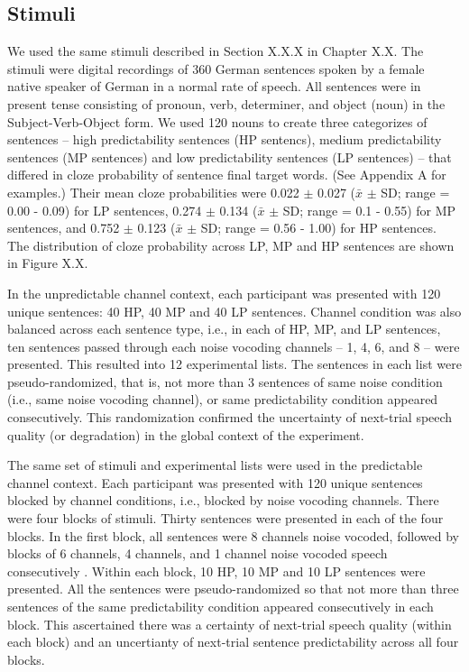 \documentclass[a4paper, nobind]{templates/ociamthesis}
\begin{document}
\hypertarget{stimuli-2}{%
\subsection{Stimuli}\label{stimuli-2}}

We used the same stimuli described in Section X.X.X in Chapter X.X.
The stimuli were digital recordings of 360 German sentences spoken by a female native speaker of German in a normal rate of speech.
All sentences were in present tense consisting of pronoun, verb, determiner, and object (noun) in the Subject-Verb-Object form.
We used 120 nouns to create three categorizes of sentences -- high predictability sentences (HP sentencs), medium predictability sentences (MP sentences) and low predictability sentences (LP sentences) -- that differed in cloze probability of sentence final target words.
(See Appendix A for examples.)
Their mean cloze probabilities were 0.022 \(\pm\) 0.027 (\(\bar{x}\) \(\pm\) SD; range = 0.00 - 0.09) for LP sentences, 0.274 \(\pm\) 0.134 (\(\bar{x}\) \(\pm\) SD; range = 0.1 - 0.55) for MP sentences, and 0.752 \(\pm\) 0.123 (\(\bar{x}\) \(\pm\) SD; range = 0.56 - 1.00) for HP sentences.
The distribution of cloze probability across LP, MP and HP sentences are shown in Figure X.X.

In the unpredictable channel context, each participant was presented with 120 unique sentences: 40 HP, 40 MP and 40 LP sentences. Channel condition was also balanced across each sentence type, i.e., in each of HP, MP, and LP sentences, ten sentences passed through each noise vocoding channels -- 1, 4, 6, and 8 -- were presented.
This resulted into 12 experimental lists.
The sentences in each list were pseudo-randomized, that is, not more than 3 sentences of same noise condition (i.e., same noise vocoding channel), or same predictability condition appeared consecutively.
This randomization confirmed the uncertainty of next-trial speech quality (or degradation) in the global context of the experiment.

The same set of stimuli and experimental lists were used in the predictable channel context.
Each participant was presented with 120 unique sentences blocked by channel conditions, i.e., blocked by noise vocoding channels.
There were four blocks of stimuli.
Thirty sentences were presented in each of the four blocks.
In the first block, all sentences were 8 channels noise vocoded, followed by blocks of 6 channels, 4 channels, and 1 channel noise vocoded speech consecutively \autocite{Sheldon2008a}.
Within each block, 10 HP, 10 MP and 10 LP sentences were presented.
All the sentences were pseudo-randomized so that not more than three sentences of the same predictability condition appeared consecutively in each block.
This ascertained there was a certainty of next-trial speech quality (within each block) and an uncertianty of next-trial sentence predictability across all four blocks.
\end{document}
